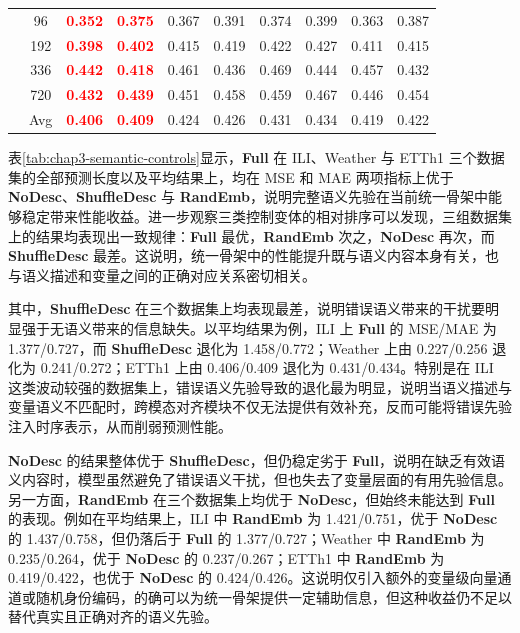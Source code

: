 \begin{table}[!htbp]
{\begin{tabular}{c|c|cc|cc|cc|cc}
& 96  & \textbf{\textcolor{red}{0.352}} & \textbf{\textcolor{red}{0.375}} & 0.367 & 0.391 & 0.374 & 0.399 & 0.363 & 0.387 \\
& 192 & \textbf{\textcolor{red}{0.398}} & \textbf{\textcolor{red}{0.402}} & 0.415 & 0.419 & 0.422 & 0.427 & 0.411 & 0.415 \\
& 336 & \textbf{\textcolor{red}{0.442}} & \textbf{\textcolor{red}{0.418}} & 0.461 & 0.436 & 0.469 & 0.444 & 0.457 & 0.432 \\
& 720 & \textbf{\textcolor{red}{0.432}} & \textbf{\textcolor{red}{0.439}} & 0.451 & 0.458 & 0.459 & 0.467 & 0.446 & 0.454 \\
& Avg & \textbf{\textcolor{red}{0.406}} & \textbf{\textcolor{red}{0.409}} & 0.424 & 0.426 & 0.431 & 0.434 & 0.419 & 0.422 \\
\bottomrule
\end{tabular}
}
\end{table}

表\ref{tab:chap3-semantic-controls}显示，\textbf{Full} 在 ILI、Weather 与 ETTh1 三个数据集的全部预测长度以及平均结果上，均在 MSE 和 MAE 两项指标上优于 \textbf{NoDesc}、\textbf{ShuffleDesc} 与 \textbf{RandEmb}，说明完整语义先验在当前统一骨架中能够稳定带来性能收益。进一步观察三类控制变体的相对排序可以发现，三组数据集上的结果均表现出一致规律：\textbf{Full} 最优，\textbf{RandEmb} 次之，\textbf{NoDesc} 再次，而 \textbf{ShuffleDesc} 最差。这说明，统一骨架中的性能提升既与语义内容本身有关，也与语义描述和变量之间的正确对应关系密切相关。

其中，\textbf{ShuffleDesc} 在三个数据集上均表现最差，说明错误语义带来的干扰要明显强于无语义带来的信息缺失。以平均结果为例，ILI 上 \textbf{Full} 的 MSE/MAE 为 1.377/0.727，而 \textbf{ShuffleDesc} 退化为 1.458/0.772；Weather 上由 0.227/0.256 退化为 0.241/0.272；ETTh1 上由 0.406/0.409 退化为 0.431/0.434。特别是在 ILI 这类波动较强的数据集上，错误语义先验导致的退化最为明显，说明当语义描述与变量语义不匹配时，跨模态对齐模块不仅无法提供有效补充，反而可能将错误先验注入时序表示，从而削弱预测性能。

\textbf{NoDesc} 的结果整体优于 \textbf{ShuffleDesc}，但仍稳定劣于 \textbf{Full}，说明在缺乏有效语义内容时，模型虽然避免了错误语义干扰，但也失去了变量层面的有用先验信息。另一方面，\textbf{RandEmb} 在三个数据集上均优于 \textbf{NoDesc}，但始终未能达到 \textbf{Full} 的表现。例如在平均结果上，ILI 中 \textbf{RandEmb} 为 1.421/0.751，优于 \textbf{NoDesc} 的 1.437/0.758，但仍落后于 \textbf{Full} 的 1.377/0.727；Weather 中 \textbf{RandEmb} 为 0.235/0.264，优于 \textbf{NoDesc} 的 0.237/0.267；ETTh1 中 \textbf{RandEmb} 为 0.419/0.422，也优于 \textbf{NoDesc} 的 0.424/0.426。这说明仅引入额外的变量级向量通道或随机身份编码，的确可以为统一骨架提供一定辅助信息，但这种收益仍不足以替代真实且正确对齐的语义先验。

